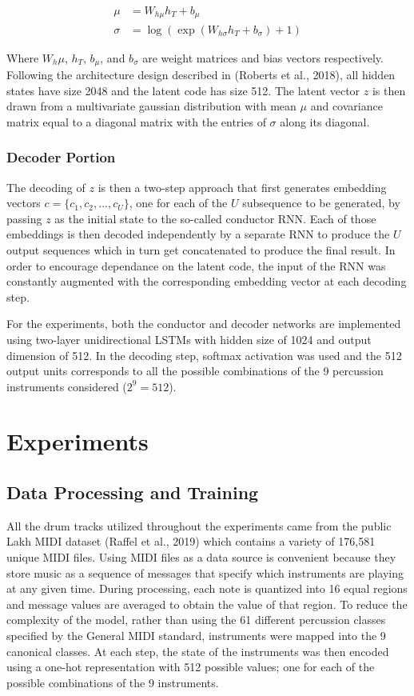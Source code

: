 \documentclass[10pt,twocolumn]{article}
\begin{document}
\begin{align*}
  \mu &= W_{h\mu} h_T + b_\mu \\
  \sigma &= \log(\exp(W_{h\sigma} h_T + b_\sigma) + 1)
\end{align*}

Where $W_h\mu$, $h_T$, $b_\mu$, and $b_\sigma$ are weight matrices and bias vectors respectively. Following the architecture design described in (Roberts et al., 2018), all hidden states have size 2048 and the latent code has size 512. The latent vector $z$ is then drawn from a multivariate gaussian distribution with mean $\mu$ and covariance matrix equal to a diagonal matrix with the entries of $\sigma$ along its diagonal.

\subsubsection{Decoder Portion}
The decoding of $z$ is then a two-step approach that first generates embedding vectors $c = \{ c_1, c_2, ..., c_U \}$, one for each of the $U$ subsequence to be generated, by passing $z$ as the initial state to the so-called conductor RNN. Each of those embeddings is then decoded independently by a separate RNN to produce the $U$ output sequences which in turn get concatenated to produce the final result. In order to encourage dependance on the latent code, the input of the RNN was constantly augmented with the corresponding embedding vector at each decoding step.

For the experiments, both the conductor and decoder networks are implemented using two-layer unidirectional LSTMs with hidden size of 1024 and output dimension of 512. In the decoding step, softmax activation was used and the 512 output units corresponds to all the possible combinations of the 9 percussion instruments considered ($2^9 = 512$).

\section{Experiments}

\subsection{Data Processing and Training}
All the drum tracks utilized throughout the experiments came from the public Lakh MIDI dataset (Raffel et al., 2019)\cite{raffel2016extracting} which contains a variety of 176,581 unique MIDI files. Using MIDI files as a data source is convenient because they store music as a sequence of messages that specify which instruments are playing at any given time. During processing, each note is quantized into 16 equal regions and message values are averaged to obtain the value of that region. To reduce the complexity of the model, rather than using the 61 different percussion classes specified by the General MIDI standard, instruments were mapped into the 9 canonical classes. At each step, the state of the instruments was then encoded using a one-hot representation with 512 possible values; one for each of the possible combinations of the 9 instruments.
\end{document}
